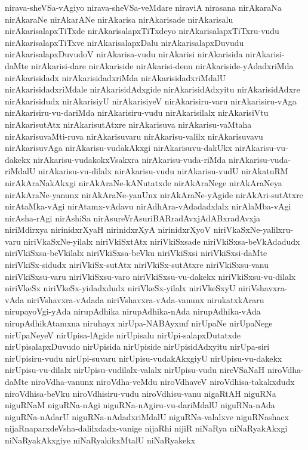 {nirava-sheVSa-vAgiyo
nirava-sheVSa-veMdare
niraviA
nirasana
nirAkaraNa
nirAkaraNe
nirAkarANe
nirAkarisa
nirAkarisade
nirAkarisalu
nirAkarisalapxTiTxde
nirAkarisalapxTiTxdeyo
nirAkarisalapxTiTxru-vudu
nirAkarisalapxTiTxve
nirAkarisalapxDalu
nirAkarisalapxDuvudu
nirAkarisalapxDuvudoV
nirAkarisa-vudu
nirAkarisi
nirAkarisida
nirAkarisi-daMte
nirAkarisi-dare
nirAkariside
nirAkarisi-denu
nirAkariside-yAdadxriMda
nirAkarisidadx
nirAkarisidadxriMda
nirAkarisidadxriMdalU
nirAkarisidadxriMdale
nirAkarisidAdxgide
nirAkarisidAdxyitu
nirAkarisidAdxre
nirAkarisidudx
nirAkarisiyU
nirAkarisiyeV
nirAkarisiru-varu
nirAkarisiru-vAga
nirAkarisiru-vu-dariMda
nirAkarisiru-vudu
nirAkarisilalx
nirAkarisiVtu
nirAkarisutAtx
nirAkarisutAtxre
nirAkarisuva
nirAkarisu-vaMtaha
nirAkarisuvaMti-ruva
nirAkarisuvaru
nirAkarisu-valilx
nirAkarisuvavu
nirAkarisuvAga
nirAkarisu-vudakAkxgi
nirAkarisuvu-dakUkx
nirAkarisu-vu-dakekx
nirAkarisu-vudakokxVsakxra
nirAkarisu-vuda-riMda
nirAkarisu-vuda-riMdalU
nirAkarisu-vu-dilalx
nirAkarisu-vudu
nirAkarisu-vudU
nirAkatuRM
nirAkAraNakAkxgi
nirAkAraNe-kANutatxde
nirAkAraNege
nirAkAraNeya
nirAkAraNe-yanunx
nirAkAraNe-yanUnx
nirAkAraNe-yAgide
nirAkAri-sutAtxre
nirAtaMka-vAgi
nirAtamx-vAdavu
nirAdhAra-vAdadadxlalx
nirAlaMba-vAgi
nirAsha-rAgi
nirAshiSa
nirAsureVrAsuriBARradAvxjAdABxradAvxja
niriMdirxya
nirinidxrXyaH
nirinidxrXyA
nirinidxrXyoV
niriVkaSxNe-yalilxru-varu
niriVkaSxNe-yilalx
niriVkiSxtAtx
niriVkiSxsade
niriVkiSxsa-beVkAdadudx
niriVkiSxsa-beVkilalx
niriVkiSxsa-beVku
niriVkiSxsi
niriVkiSxsi-daMte
niriVkiSx-sidudx
niriVkiSx-sutAtx
niriVkiSx-sutAtxre
niriVkiSxsu-vanu
niriVkiSxsu-varu
niriVkiSxsu-varo
niriVkiSxsu-vu-dakekx
niriVkiSxsu-vu-dilalx
niriVkeSx
niriVkeSx-yidadxdudx
niriVkeSx-yilalx
niriVkeSxyU
niriVshavxra-vAda
niriVshavxra-vAdada
niriVshavxra-vAda-vanunx
nirukatxkAraru
nirupayoVgi-yAda
nirupAdhika
nirupAdhika-nAda
nirupAdhika-vAda
nirupAdhikAtamxna
niruhayx
nirUpa-NABAyxmf
nirUpaNe
nirUpaNege
nirUpaNeyeV
nirUpisa-lAgide
nirUpisalu
nirUpi-salapxDutatxde
nirUpisalapxDuvudo
nirUpisida
nirUpiside
nirUpisidAdxyitu
nirUpa-siri
nirUpisiru-vudu
nirUpi-suvaru
nirUpisu-vudakAkxgiyU
nirUpisu-vu-dakekx
nirUpisu-vu-dilalx
nirUpisu-vudilalx-valalx
nirUpisu-vudu
nireVSaNaH
niroVdha-daMte
niroVdha-vanunx
niroVdha-veMdu
niroVdhaveV
niroVdhisa-takakxdudx
niroVdhisa-beVku
niroVdhisiru-vudu
niroVdhisu-vanu
nigaRtAH
niguRNa
niguRNaM
niguRNa-nAgi
niguRNa-nAgiru-vu-dariMdalU
niguRNa-nAda
niguRNa-nAdarU
niguRNa-nAdadxriMdalU
niguRNa-valalxve
niguRNashacx
nijaRnaparxdeVsha-dalilxdadx-vanige
nijaRhi
nijiR
niNaRya
niNaRyakAkxgi
niNaRyakAkxgiye
niNaRyakikxMtalU
niNaRyakekx
}
